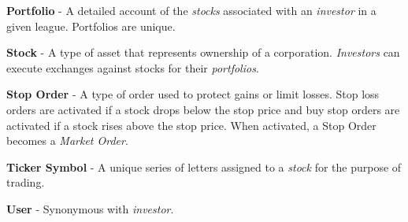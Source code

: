 {\textbf{Portfolio} - A detailed account of the \emph{stocks} associated with an \emph{investor} 
in a given league. Portfolios are unique. 

\textbf{Stock} - A type of asset that represents ownership of a corporation. \emph{Investors} can
execute exchanges against stocks for their \emph{portfolios}.

\textbf{Stop Order} - A type of order used to protect gains or limit losses. Stop loss
orders are activated if a stock drops below the stop price and buy stop orders
are activated if a stock rises above the stop price. When activated, a Stop Order becomes a
\emph{Market Order}. 

\textbf{Ticker Symbol} - A unique series of letters assigned to a \emph{stock} for the purpose of
trading.

\textbf{User} - Synonymous with \emph{investor}.

}